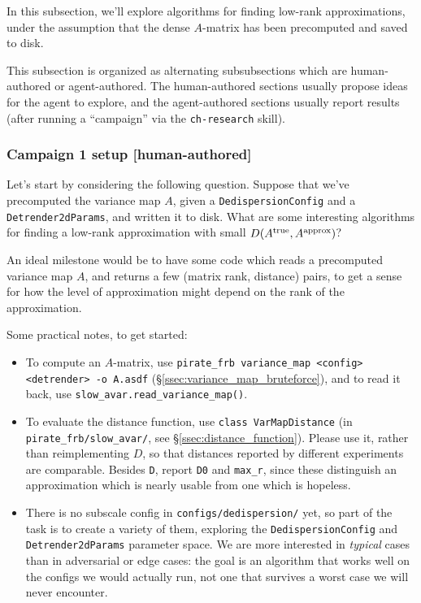 \documentclass{article}
\numberwithin{equation}{section}   %
\begin{document}
In this subsection, we'll explore algorithms for finding low-rank approximations,
under the assumption that the dense $A$-matrix has been precomputed and saved to disk.

This subsection is organized as alternating subsubsections which are human-authored
or agent-authored.
The human-authored sections usually propose ideas for the agent to explore, and the
agent-authored sections usually report results (after running a ``campaign'' via the
\verb|ch-research| skill).

\subsubsection{Campaign 1 setup [human-authored]}

Let's start by considering the following question.
Suppose that we've precomputed the variance map $A$, given a {\tt DedispersionConfig} 
and a {\tt Detrender2dParams}, and written it to disk.
What are some interesting algorithms for finding a low-rank approximation with
small $D(A^{\rm true}, A^{\rm approx})$?

An ideal milestone would be to have some code which reads a precomputed variance map $A$,
and returns a few (matrix rank, distance) pairs, to get a sense for how the level of approximation
might depend on the rank of the approximation.

Some practical notes, to get started:
\begin{itemize}

\item To compute an $A$-matrix, use \verb|pirate_frb variance_map <config> <detrender> -o A.asdf|
 (\S\ref{ssec:variance_map_bruteforce}), and to read it back, use
 \verb|slow_avar.read_variance_map()|.

\item To evaluate the distance function, use \verb|class VarMapDistance| (in
 \verb|pirate_frb/slow_avar/|, see \S\ref{ssec:distance_function}). Please use it, rather than
 reimplementing $D$, so that distances reported by different experiments are comparable.
 Besides \verb|D|, report \verb|D0| and \verb|max_r|, since these distinguish an approximation
 which is nearly usable from one which is hopeless.

\item There is no subscale config in \verb|configs/dedispersion/| yet, so part of the task is to
 create a variety of them, exploring the {\tt DedispersionConfig} and {\tt Detrender2dParams}
 parameter space. We are more interested in {\em typical} cases than in adversarial or edge
 cases: the goal is an algorithm that works well on the configs we would actually run, not one
 that survives a worst case we will never encounter.

\end{itemize}
\end{document}
